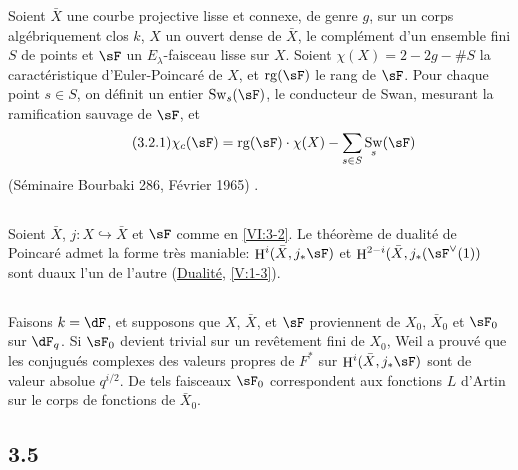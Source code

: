 \documentclass[oneside]{book}
\DeclareMathOperator{\h}{H}
\DeclareMathOperator{\swan}{Sw}
\theoremstyle{sga-source}
\theoremstyle{sga-source-dash}
\theoremstyle{sga-source-dotdash}
\theoremstyle{sga-source-number-note-dash}
\theoremstyle{sga-source-note-number-dotdash}
\theoremstyle{sga-source-example-dotdash}
\theoremstyle{sga-source-inline-number}
\theoremstyle{sga-source-bare-number}
\theoremstyle{sga-source}
\newcommand{\PrintPage}[1]{}\newcommand{\MathPage}[1]{}\newcommand{\PrintCite}[2]{#1}\newcommand{\var}[3]{#1}
\begin{document}
Soient $\bar X$ une courbe projective lisse et connexe, de genre $g$, sur un 
corps algébriquement clos $k$, $X$ un ouvert dense de $\bar X$, 
le complément d'un ensemble fini $S$ de points et $\sF$ un 
$E_\lambda$-faisceau lisse sur $X$. Soient $\chi(X)=2-2 g-\# S$ la 
caractéristique d'Euler-Poincaré de $X$, et $\operatorname{rg}(\sF)$ le 
rang de $\sF$. Pour chaque point $s\in S$, on définit un entier 
$\swan_s(\sF)$, le conducteur de Swan, mesurant la ramification sauvage de 
$\sF$, et 
\begin{align*}\tag{3.2.1}\label{VI:eq:3-2-1}
  \chi_c(\sF) = \operatorname{rg}(\sF) \cdot \chi(X) - \sum_{s\in S} \swan_s(\sF) 
\end{align*}
(Séminaire Bourbaki 286, Février 1965) \cite{ra65}. 





\subsection{}\label{VI:3-3}

Soient $\bar X$, $j:X\hookrightarrow\bar X$ et $\sF$ comme en \ref{VI:3-2}. Le 
théorème de dualité de Poincaré admet la forme très maniable: 
$\h^i(\bar X,j_\ast \sF)$ et $\var{\h^{2-i}(\bar X,j_\ast(\sF^\vee(1))}{\h^{2-i}(\bar X,j_\ast(\sF^\vee(1)))}{S45-SOL-0757}$ sont 
duaux l'un de l'autre (\hyperref[V]{Dualité}, \ref{V:1-3}). 





\PrintPage{190}
\subsection{}\label{VI:3-4}

Faisons $k=\dF$, et supposons que $X$, $\bar X$, et $\sF$ proviennent de 
$X_0$, $\bar X_0$ et $\sF_0$ sur $\dF_q$. Si $\sF_0$ devient trivial sur un 
revêtement fini de $X_0$, Weil a prouvé que les conjugués complexes des 
valeurs propres de $F^\ast$ sur $\h^i(\bar X,j_\ast\sF)$ sont de valeur 
absolue $q^{i/2}$. De tels faisceaux $\sF_0$ correspondent aux fonctions $L$ 
d'Artin sur le corps de fonctions de $\bar X_0$. 





\subsection*{3.5}\label{VI:3-5_} %
\end{document}
